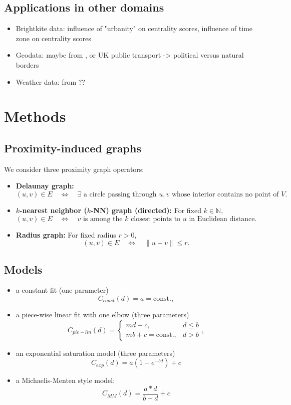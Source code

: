 \documentclass[fleqn,10pt]{olplainarticle}
\begin{document}
\subsection{Applications in other domains}
\begin{itemize}
    \item Brightkite data: influence of "urbanity" on centrality scores, influence of time zone on centrality scores
    \item Geodata: maybe from \cite{gil2015examining}, or UK public transport -> political versus natural borders
    \item Weather data: from \cite{rheinwalt2012boundary}??
\end{itemize}
\FloatBarrier

\section*{Methods}
\subsection*{Proximity-induced graphs}
We consider three proximity graph operators:

\begin{itemize}
    \item \textbf{Delaunay graph:}
    \[
    (u,v) \in E 
    \quad \Longleftrightarrow \quad
    \exists \text{ a circle passing through } u,v 
    \text{ whose interior contains no point of } V.
    \]

    \item \textbf{$k$-nearest neighbor ($k$-NN) graph (directed):}
    For fixed $k \in \mathbb{N}$,
    \[
    (u,v) \in E 
    \quad \Longleftrightarrow \quad
    v \text{ is among the } k \text{ closest points to } u 
    \text{ in Euclidean distance}.
    \]

    \item \textbf{Radius graph:}
    For fixed radius $r>0$,
    \[
    (u,v) \in E 
    \quad \Longleftrightarrow \quad
    \|u - v\| \le r.
    \]
\end{itemize}

\subsection*{Models}
\begin{itemize}
    \item a constant fit (one parameter)
    $$C_{const}(d) = a = \text{const.},$$
    \item a piece-wise linear fit with one elbow (three parameters)
    $$C_{pie-lin}(d) = \begin{cases}
    m d + c, & d \le b \\
    m b + c = \text{const.}, & d > b
    \end{cases},$$
    \item an exponential saturation model (three parameters)
    $$C_{exp}(d) = a (1-e^{-bd}) + c$$
    \item a Michaelis-Menten style model:
    $$C_{MM}(d) = \frac{a*d}{b+d} + c$$
\end{itemize} 
\end{document}
